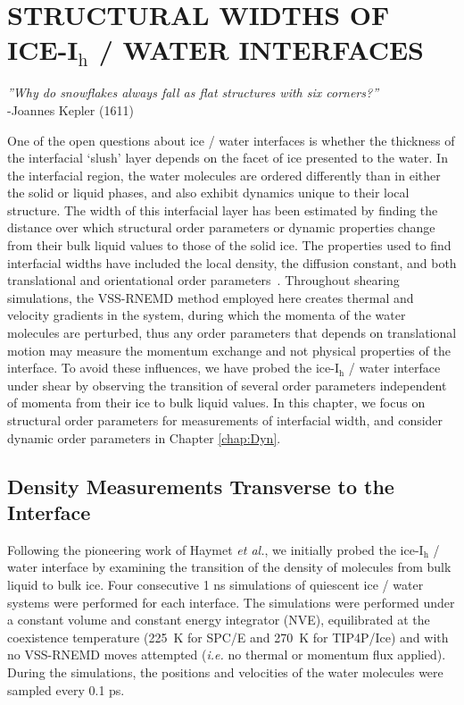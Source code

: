 
\chapter{STRUCTURAL WIDTHS OF ICE-I$_\mathrm{h}$ / WATER
  INTERFACES}\label{chap:Str}


\begin{flushright}
\textit{''Why do snowflakes always fall as flat structures with six corners?''} \\
-Joannes Kepler (1611) \\
\end{flushright}

One of the open questions about ice / water interfaces is whether the
thickness of the interfacial `slush' layer depends on the facet of ice
presented to the water. In the interfacial region, the water molecules
are ordered differently than in either the solid or liquid phases, and
also exhibit dynamics unique to their local structure.  The width of
this interfacial layer has been estimated by finding the distance over
which structural order parameters or dynamic properties change from
their bulk liquid values to those of the solid ice. The properties
used to find interfacial widths have included the local density, the
diffusion constant, and both translational and orientational order
parameters~\cite{Karim1988,Karim1990,Hayward2001,Hayward2002,Bryk2002,Gay2002,Louden2013a}. Throughout
shearing simulations, the VSS-RNEMD method employed here creates
thermal and velocity gradients in the system, during which the momenta
of the water molecules are perturbed, thus any order parameters that
depends on translational motion may measure the momentum exchange and
not physical properties of the interface. To avoid these influences,
we have probed the ice-I$_\mathrm{h}$ / water interface under shear by
observing the transition of several order parameters independent of
momenta from their ice to bulk liquid values.  In this chapter, we
focus on structural order parameters for measurements of interfacial
width, and consider dynamic order parameters in Chapter
\ref{chap:Dyn}.

\section{Density Measurements Transverse to the Interface}
Following the pioneering work of Haymet \textit{et al.}, we initially
probed the ice-I$_\mathrm{h}$ / water interface by examining the
transition of the density of molecules from bulk liquid to bulk
ice.\cite{Karim1987,Karim1990,Hayward2001,Bryk2004} Four consecutive 1
ns simulations of quiescent ice / water systems were performed for
each interface. The simulations were performed under a constant volume
and constant energy integrator (NVE), equilibrated at the coexistence
temperature (225~K for SPC/E and 270~K for TIP4P/Ice) and with no
VSS-RNEMD moves attempted (\textit{i.e.} no thermal or momentum flux
applied). During the simulations, the positions and velocities of the
water molecules were sampled every 0.1 ps.

